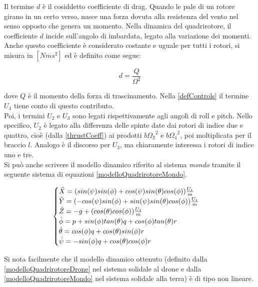 Il termine $d$ è il cosiddetto coefficiente di drag. Quando le pale di un rotore girano in un certo verso, nasce una forza dovuta alla resistenza del vento nel senso opposto che genera un momento. Nella dinamica del quadrirotore, il coefficiente $d$ incide sull'angolo di imbardata, legato alla variazione dei momenti. Anche questo coefficiente è considerato costante e uguale per tutti i rotori, si misura in $[N m s^2]$ ed è definito come segue:

\begin{equation}
	d = \frac{Q}{\Omega^2}
\end{equation}

dove $Q$ è il momento della forza di trascinamento. Nella \ref{defControls} il termine $U_4$ tiene conto di questo contributo.\\

Poi, i termini $U_2$ e $U_3$ sono legati rispettivamente agli angoli di roll e pitch. Nello specifico, $U_2$ è legato alla differenza delle spinte date dai rotori di indice due e quattro, cioè (dalla \ref{thrustCoeff}) ai prodotti $b{\Omega_2}^2$ e $b{\Omega_4}^2$, poi moltiplicata per il braccio $l$. Analogo è il discorso per $U_3$, ma chiaramente interessa i rotori di indice uno e tre.\\

Si può anche scrivere il modello dinamico riferito al sistema \emph{mondo} tramite il seguente sistema di equazioni \ref{modelloQuadrirotoreMondo}.

\begin{equation}
	\begin{cases}
	\Ddot{X} = (sin(\psi)sin(\phi) + cos(\psi)sin(\theta)cos(\phi))\frac{U_1}{m} \\
	\Ddot{Y} = (-cos(\psi)sin(\phi) + sin(\psi)sin(\theta)cos(\phi))\frac{U_1}{m} \\
	\Ddot{Z} = -g + (cos(\theta)cos(\phi))\frac{U_1}{m} \\
	\Dot{\phi} = p + sin(\phi)tan(\theta)q + cos(\phi)tan(\theta)r \\
	\Dot{\theta} = cos(\phi)q + cos(\theta)sin(\phi)r \\
	\Dot{\psi} = -sin(\phi)q + cos(\theta)cos(\phi)r
	\end{cases}
	\label{modelloQuadrirotoreMondo}
\end{equation}

Si nota facilmente che il modello dinamico ottenuto (definito dalla \ref{modelloQuadrirotoreDrone} nel sistema solidale al drone e dalla \ref{modelloQuadrirotoreMondo} nel sistema solidale alla terra) è di tipo non lineare.


